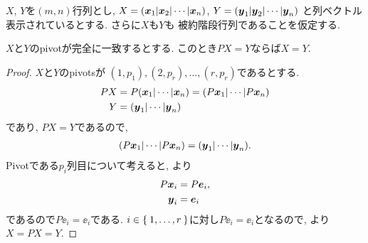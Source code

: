 $X$, $Y$を$(m,n)$行列とし,
$X=(\boldsymbol{x}_1|\boldsymbol{x}_2|\cdots|\boldsymbol{x}_n)$,
$Y=(\boldsymbol{y}_1|\boldsymbol{y}_2|\cdots|\boldsymbol{y}_n)$
と列ベクトル表示されているとする.
さらに$X$も$Y$も
被約階段行列であることを仮定する.

\begin{lemma}
  \label{lem:7}
  $X$と$Y$のpivotが完全に一致するとする.
  このとき$PX=Y$ならば$X=Y$.
\end{lemma}
\begin{proof}
  $X$と$Y$のpivotsが
  $(1,p_1),(2,p_r),\ldots,(r,p_r)$であるとする.
  \begin{align*}
    PX&=P(\boldsymbol{x}_1|\cdots|\boldsymbol{x}_n)=(P\boldsymbol{x}_1|\cdots|P\boldsymbol{x}_n)\\
    Y&=(\boldsymbol{y}_1|\cdots|\boldsymbol{y}_n)
  \end{align*}
  であり, $PX=Y$であるので,
  \begin{align*}
    (P\boldsymbol{x}_1|\cdots|P\boldsymbol{x}_n)=(\boldsymbol{y}_1|\cdots|\boldsymbol{y}_n).
  \end{align*}
  Pivotである$p_i$列目について考えると,
  より
  \begin{align*}
    P\boldsymbol{x}_i&=P\boldsymbol{e}_i,\\
    \boldsymbol{y}_i&=\boldsymbol{e}_i
  \end{align*}
  であるので$P\ee_i=\ee_i$である.
  $i\in\Set{1,\ldots,r}$に対し$P\ee_i=\ee_i$となるので,
  より$X=PX=Y$.  
\end{proof}

